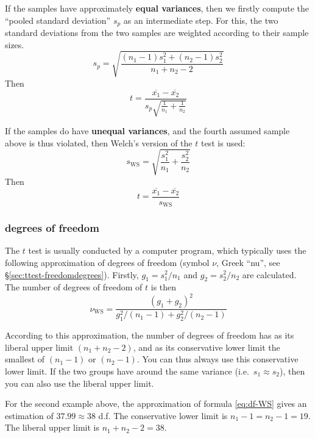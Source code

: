 \documentclass[
]{book}
\begin{document}
If the samples have approximately \textbf{equal variances}, then we firstly compute
the ``pooled standard deviation'' \(s_p\) as an intermediate step. For this, the two
standard deviations from the two samples are weighted according
to their sample sizes.
\begin{equation}
    s_p = \sqrt{ \frac{(n_1-1) s^2_1 + (n_2-1) s^2_2} {n_1+n_2-2} }
    \label{eq:sd-pooled}
\end{equation}
Then
\begin{equation}
  \label{eq:t-homoskedastic}
  t = \frac{ \overline{x_1}-\overline{x_2} } { s_p \sqrt{\frac{1}{n_1}+\frac{1}{n_2}} }
\end{equation}

If the samples do have \textbf{unequal variances}, and the fourth assumed
sample above is thus violated, then Welch's version of the \(t\) test is
used:
\begin{equation}
  \label{eq:sd-WS}
  s_{\textrm{WS}} = \sqrt{\frac{s^2_1}{n_1}+\frac{s^2_2}{n_2} }
\end{equation}
Then
\begin{equation}
  \label{eq:t-WS}
  t = \frac{ \overline{x_1}-\overline{x_2} } { s_{\textrm{WS}} }
\end{equation}

\subsubsection{degrees of freedom}\label{freedomdegrees}

The \(t\) test is usually conducted by a computer program, which typically uses the following approximation of degrees of freedom (symbol \(\nu\), Greek ``nu'', see §\ref{sec:ttest-freedomdegrees}).
Firstly, \(g_1=s^2_1/n_1\)
and \(g_2=s^2_2/n_2\) are calculated. The number of degrees of freedom of \(t\) is then
\begin{equation}
  \label{eq:df-WS}
  \nu_\textrm{WS} = 
        \frac {(g_1+g_2)^2} {g^2_1/(n_1-1) + g^2_2/(n_2-1)}
\end{equation}

According to this approximation, the number of degrees of freedom has as its liberal
upper limit \((n_1+n_2-2)\), and as its conservative lower limit the smallest
of \((n_1-1)\) or \((n_2-1)\). You can thus always use this conservative
lower limit. If the two groups have around the same variance
(i.e.~\(s_1 \approx s_2\)), then you can also use the liberal upper
limit.

For the second example above, the approximation of formula
\eqref{eq:df-WS} gives
an estimation of \(37.99 \approx 38\) d.f. The conservative lower limit is
\(n_1-1 = n_2-1 = 19\). The liberal upper limit is \(n_1+n_2 -2 = 38\).
\end{document}
